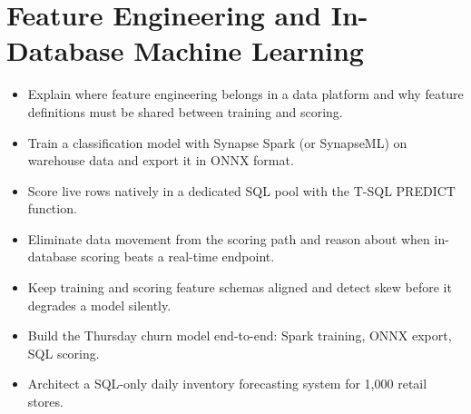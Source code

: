 \chapter{Feature Engineering and In-Database Machine Learning}
%
\begin{objectives}
\begin{itemize}
    \item Explain where feature engineering belongs in a data platform and why feature definitions must be shared between training and scoring.
    \item Train a classification model with Synapse Spark (or SynapseML) on warehouse data and export it in ONNX format.
    \item Score live rows natively in a dedicated SQL pool with the T-SQL PREDICT function.
    \item Eliminate data movement from the scoring path and reason about when in-database scoring beats a real-time endpoint.
    \item Keep training and scoring feature schemas aligned and detect skew before it degrades a model silently.
    \item Build the Thursday churn model end-to-end: Spark training, ONNX export, SQL scoring.
    \item Architect a SQL-only daily inventory forecasting system for 1{,}000 retail stores.
\end{itemize}
\end{objectives}

